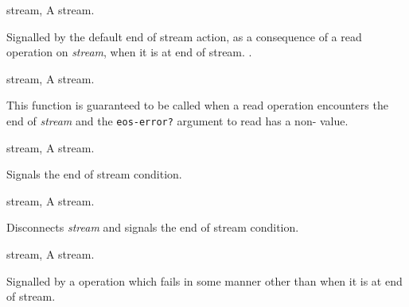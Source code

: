 \begin{optDefinition}
\begin{initoptions}
    \item[stream, \classref{stream}] A stream.
\end{initoptions}
%
\remarks%
Signalled by the default end of stream action, as a consequence of a
read operation on {\em stream\/}, when it is at end of stream.
%
\seealso%
.

\begin{genericargs}
    \item[stream, \classref{buffered-stream}] A stream.
\end{genericargs}
%
\remarks%
This function is guaranteed to be called when a read operation
encounters the end of {\em stream\/} and the {\tt eos-error?} argument to read
has a non-\nil{}\/ value.

\begin{specargs}
    \item[stream, \classref{buffered-stream}] A stream.
\end{specargs}
%
\remarks%
Signals the end of stream condition.

\begin{specargs}
    \item[stream, \classref{file-stream}] A stream.
\end{specargs}
%
\remarks%
Disconnects {\em stream\/} and signals the end of stream condition.


%
\begin{genericargs}
    \item[stream, \classref{stream}] A stream.
\end{genericargs}
%
\remarks%
Signalled by a  operation which fails in some manner other
than when it is at end of stream.


\end{optDefinition}
